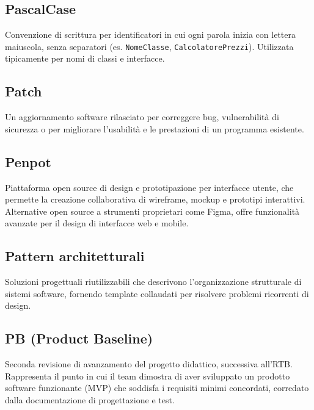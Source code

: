 \documentclass[a4paper, 11pt, oneside]{scrartcl} %
\begin{document}
\subsection*{PascalCase}
Convenzione di scrittura per identificatori in cui ogni parola inizia con lettera maiuscola, senza separatori (es. \texttt{NomeClasse}, \texttt{CalcolatorePrezzi}). Utilizzata tipicamente per nomi di classi e interfacce.
\vspace{0.5cm}

\subsection*{Patch}
Un aggiornamento software rilasciato per correggere bug, vulnerabilità di sicurezza o per migliorare l'usabilità e le prestazioni di un programma esistente.
\vspace{0.5cm}

\subsection*{Penpot}
Piattaforma open source di design e prototipazione per interfacce utente, che permette la creazione collaborativa di wireframe, mockup e prototipi interattivi. Alternative open source a strumenti proprietari come Figma, offre funzionalità avanzate per il design di interfacce web e mobile.
\vspace{0.5cm}

\subsection*{Pattern architetturali}


Soluzioni progettuali riutilizzabili che descrivono l'organizzazione strutturale di sistemi software, fornendo template collaudati per risolvere problemi ricorrenti di design.

\vspace{0.5cm}

\subsection*{PB (Product Baseline)}
Seconda revisione di avanzamento del progetto didattico, successiva all'RTB. Rappresenta il punto in cui il team dimostra di aver sviluppato un prodotto software funzionante (MVP) che soddisfa i requisiti minimi concordati, corredato dalla documentazione di progettazione e test.
\vspace{0.5cm}
\end{document}
